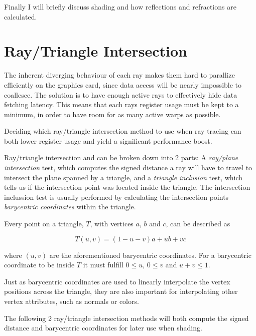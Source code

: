 Finally I will briefly discuss shading and how reflections and
refractions are calculated.

\section{Ray/Triangle Intersection}

The inherent diverging behaviour of each ray makes them hard to
parallize efficiently on the graphics card, since data access will be
nearly impossible to coallesce. The solution is to have enough active
rays to effectively hide data fetching latency. This means that each
rays register usage must be kept to a minimum, in order to have room
for as many active warps as possible.

Deciding which ray/triangle intersection method to use when ray
tracing can both lower register usage and yield a significant
performance boost.


Ray/triangle intersection and can be broken down into 2 parts: A
\textit{ray/plane intersection} test, which computes the signed
distance a ray will have to travel to intersect the plane spanned by a
triangle, and a \textit{triangle inclusion} test, which tells us if
the intersection point was located inside the triangle. The
intersection inclussion test is usually performed by calculating the
intersection points \textit{barycentric coordinates} within the
triangle.

Every point on a triangle, $T$, with vertices $a$, $b$ and $c$, can be
described as

\begin{displaymath}
  T(u,v) = (1-u-v)a + ub + vc
\end{displaymath}
 
where $(u, v)$ are the aforementioned barycentric coordinates. For a
barycentric coordinate to be inside $T$ it must fulfill $0 \le u$, $0
\le v$ and $u+v \le 1$.

Just as barycentric coordinates are used to linearly interpolate the
vertex positions across the triangle, they are also important for
interpolating other vertex attributes, such as normals or colors.

The following 2 ray/triangle intersection methods will both compute
the signed distance and barycentric coordinates for later use when
shading.

